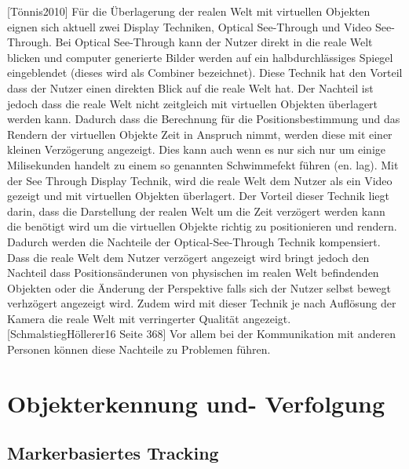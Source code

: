 [Tönnis2010] Für die Überlagerung der realen Welt mit virtuellen Objekten eignen sich aktuell zwei Display Techniken,  Optical See-Through und Video See-Through. 
Bei Optical See-Through kann der Nutzer direkt in die reale Welt blicken und computer generierte Bilder werden auf ein halbdurchlässiges Spiegel eingeblendet (dieses wird als Combiner bezeichnet).
Diese Technik hat den Vorteil dass der Nutzer einen direkten Blick auf die reale Welt hat. Der Nachteil ist jedoch dass die reale Welt nicht zeitgleich mit virtuellen Objekten überlagert werden kann. 
Dadurch dass die Berechnung für die Positionsbestimmung und das Rendern der virtuellen Objekte Zeit in Anspruch nimmt, werden diese mit einer kleinen Verzögerung angezeigt. Dies kann auch 
wenn es nur sich nur um einige Milisekunden handelt zu einem so genannten Schwimmefekt führen (en. lag). Mit der See Through Display Technik, wird die reale Welt dem Nutzer als ein Video 
gezeigt und mit virtuellen Objekten überlagert. Der Vorteil dieser Technik liegt darin, dass die Darstellung der realen Welt um die Zeit verzögert werden kann die benötigt wird um die virtuellen Objekte 
richtig zu positionieren und rendern. Dadurch werden die Nachteile der Optical-See-Through Technik kompensiert. Dass die reale Welt dem Nutzer verzögert angezeigt wird bringt jedoch den Nachteil 
dass Positionsänderunen von physischen im realen Welt befindenden Objekten oder die Änderung der Perspektive falls sich der Nutzer selbst bewegt verhzögert angezeigt wird. Zudem wird mit 
dieser Technik je nach Auflösung der Kamera die reale Welt mit verringerter Qualität angezeigt. [SchmalstiegHöllerer16 Seite 368] Vor allem bei der Kommunikation mit anderen Personen können diese 
Nachteile zu Problemen führen. 

\section{Objekterkennung und- Verfolgung}



\subsection{Markerbasiertes Tracking}


